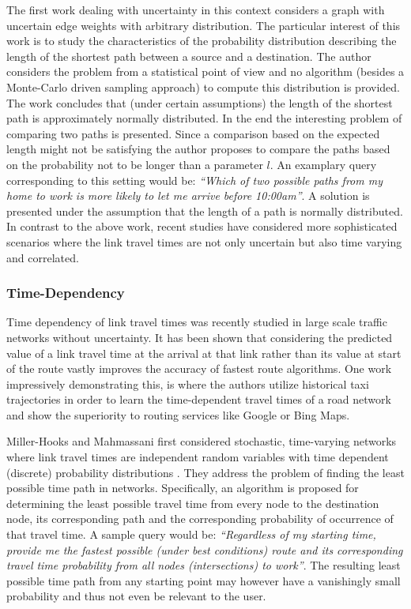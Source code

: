 The first work \cite{Frank69}  dealing with uncertainty in this context considers
a graph with uncertain edge weights with arbitrary distribution. The particular
interest of this work is to study the characteristics of the probability
distribution describing the length of the shortest path between a source and a
destination.
The author considers the problem from a statistical point of view and no algorithm (besides
a Monte-Carlo driven sampling approach) to compute this distribution is
provided.
The work concludes that (under certain assumptions) the length of the shortest
path is approximately normally distributed. In the end the interesting problem of
comparing two paths is presented. Since a comparison based on the expected
length might not be satisfying the author proposes to compare the paths based on
the probability not to be longer than a parameter $l$. An examplary query
corresponding to this setting would be: \textit{``Which of two possible paths
from my home to work is more likely to let me arrive before 10:00am''}. A
solution is presented under the assumption that the length of a path is normally
distributed.
In contrast to the above work, recent studies have considered more
sophisticated scenarios where the link travel times are not only uncertain but
also time varying and correlated.

\subsubsection{Time-Dependency}
Time dependency of link travel times was recently studied in
large scale traffic networks \cite{Demiryurek11,Pan12} without uncertainty.
It has been shown that considering the predicted value of a link travel time at the arrival at
that link rather than its value at start of the route vastly improves the accuracy of fastest route
algorithms. One work impressively demonstrating this, is \cite{Yuan13} where
the authors utilize historical taxi trajectories in order to learn the
time-dependent travel times of a road network and show the superiority to
routing services like Google or Bing Maps.

Miller-Hooks and Mahmassani first considered stochastic,
time-varying networks where link travel times are independent random variables
with time dependent (discrete) probability distributions \cite{Miller-Hooks98}.
They address the problem of finding the least possible time path in networks. Specifically, an
algorithm is proposed for determining the least possible travel time from every node to the destination node, its corresponding path and the corresponding probability of
occurrence of that travel time. A sample query would be: \textit{``Regardless
of my starting time, provide me the fastest possible (under best conditions)
route and its corresponding travel time probability from all nodes (intersections) to
work''}. The resulting least possible time path from any starting point may
however have a vanishingly small probability and thus not even be relevant to
the user.

